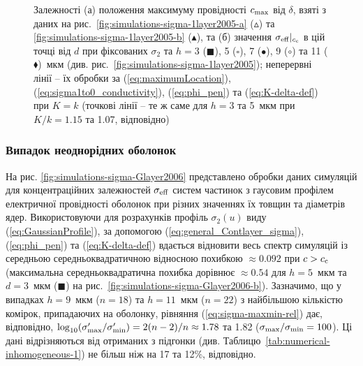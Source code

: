 \documentclass[14pt,twoside]{vakthesis}
\begin{document}
\begin{figure}[tb]
	\caption{\label{fig:simulations-max-1layer2005} 
		Залежності \cite{Siekierski2005} (а) положення максимуму провідності $c_{\rm max}$ від $\delta$, взяті з даних на рис.~\ref{fig:simulations-sigma-1layer2005-a} ($\vartriangle$) та \ref{fig:simulations-sigma-1layer2005-b} ($\blacktriangle$), та (б) значення $\sigma_{\rm eff}|_{c_{\rm c}}$ в цій точці від $d$ при фіксованих $\sigma_2$ та $h = 3$ ($\blacksquare$), 5 ($\square$), 7 ($\bullet$), 9 ($\circ$) та 11 ($\blacklozenge$)~мкм (див. рис.~\ref{fig:simulations-sigma-1layer2005}); неперервні лінії -- їх обробки за (\ref{eq:maximumLocation}), (\ref{eq:sigma1to0_conductivity}),  (\ref{eq:phi_pen}) та (\ref{eq:K-delta-def}) при $K=k$ (точкові лінії -- те ж саме для $h = 3$ та 5~мкм при $K/k = 1.15$ та 1.07, відповідно)}
\end{figure}

\subsubsection{Випадок неоднорідних оболонок}

На рис. \ref{fig:simulations-sigma-Glayer2006} представлено обробки даних симуляцій \cite{Siekierski2006} для концентраційних залежностей $\sigma_{\rm eff}$ систем частинок з гаусовим профілем електричної провідності оболонок при різних значеннях їх товщин та діаметрів ядер. Використовуючи для розрахунків профіль $\sigma_2(u)$ виду (\ref{eq:GaussianProfile}), за допомогою (\ref{eq:general_Contlayer_sigma}), (\ref{eq:phi_pen}) та (\ref{eq:K-delta-def}) вдається відновити весь спектр симуляцій {\color{violet}із середньою середньоквадратичною відносною похибкою $\approx 0.092$ при $c > c_{\rm c}$
(максимальна середньоквадратична похибка дорівнює $\approx 0.54$ для $h=5$~мкм та $d=3$~мкм ($\blacksquare$) на рис.~\ref{fig:simulations-sigma-Glayer2006-b})}.
Зазначимо, що у випадках $h = 9$~мкм ($n = 18$) та $h = 11$~мкм ($n = 22$) з найбільшою кількістю комірок, припадаючих на оболонку, рівняння (\ref{eq:sigma-maxmin-rel}) дає, відповідно, $\log_{10} (\sigma'_{\rm max}/\sigma'_{\rm min}) = 2(n-2)/n \approx 1.78$ та 1.82  ($\sigma_{\rm max}/\sigma_{\rm min} = 100$). Ці дані відрізняються від отриманих з підгонки (див. Таблицю~\ref{tab:numerical-inhomogeneous-1}) не більш ніж на 17 та 12\%, відповідно. 
\end{document}
